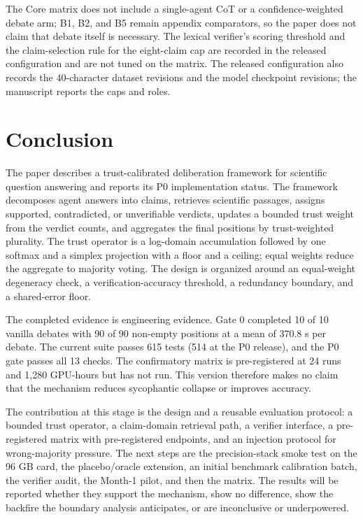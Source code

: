 \documentclass[a4paper,fleqn]{cas-sc}
\begin{document}
The Core matrix does not include a single-agent CoT or a confidence-weighted debate arm; B1, B2, and B5 remain appendix comparators, so the paper does not claim that debate itself is necessary. The lexical verifier's scoring threshold and the claim-selection rule for the eight-claim cap are recorded in the released configuration and are not tuned on the matrix. The released configuration also records the 40-character dataset revisions and the model checkpoint revisions; the manuscript reports the caps and roles.

\section{Conclusion}

The paper describes a trust-calibrated deliberation framework for scientific question answering and reports its P0 implementation status. The framework decomposes agent answers into claims, retrieves scientific passages, assigns supported, contradicted, or unverifiable verdicts, updates a bounded trust weight from the verdict counts, and aggregates the final positions by trust-weighted plurality. The trust operator is a log-domain accumulation followed by one softmax and a simplex projection with a floor and a ceiling; equal weights reduce the aggregate to majority voting. The design is organized around an equal-weight degeneracy check, a verification-accuracy threshold, a redundancy boundary, and a shared-error floor.

The completed evidence is engineering evidence. Gate 0 completed 10 of 10 vanilla debates with 90 of 90 non-empty positions at a mean of 370.8 s per debate. The current suite passes 615 tests (514 at the P0 release), and the P0 gate passes all 13 checks. The confirmatory matrix is pre-registered at 24 runs and 1{,}280 GPU-hours but has not run. This version therefore makes no claim that the mechanism reduces sycophantic collapse or improves accuracy.

The contribution at this stage is the design and a reusable evaluation protocol: a bounded trust operator, a claim-domain retrieval path, a verifier interface, a pre-registered matrix with pre-registered endpoints, and an injection protocol for wrong-majority pressure. The next steps are the precision-stack smoke test on the 96 GB card, the placebo/oracle extension, an initial benchmark calibration batch, the verifier audit, the Month-1 pilot, and then the matrix. The results will be reported whether they support the mechanism, show no difference, show the backfire the boundary analysis anticipates, or are inconclusive or underpowered.
\end{document}
